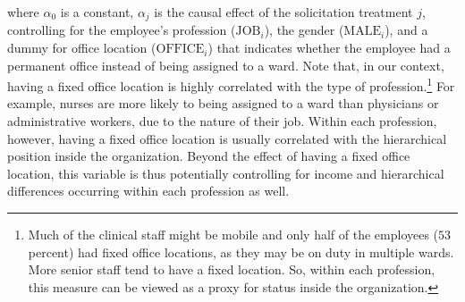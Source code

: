 \documentclass[11pt, titlepage]{article}
\begin{document}
where \(\alpha_0\) is a constant, \(\alpha_j\) is the causal effect of
the solicitation treatment \(j\), controlling for the employee's
profession (\(\text{JOB}_i\)), the gender (\(\text{MALE}_i\)), and a
dummy for office location (\(\text{OFFICE}_i\)) that indicates whether
the employee had a permanent office instead of being assigned to a ward.
Note that, in our context, having a fixed office location is highly
correlated with the type of profession.\footnote{Much of the clinical
  staff might be mobile and only half of the employees (\(53\) percent)
  had fixed office locations, as they may be on duty in multiple wards.
  More senior staff tend to have a fixed location. So, within each
  profession, this measure can be viewed as a proxy for status inside
  the organization.} For example, nurses are more likely to being
assigned to a ward than physicians or administrative workers, due to the
nature of their job. Within each profession, however, having a fixed
office location is usually correlated with the hierarchical position
inside the organization. Beyond the effect of having a fixed office
location, this variable is thus potentially controlling for income and
hierarchical differences occurring within each profession as well.
\end{document}
